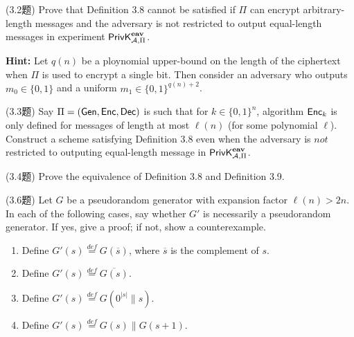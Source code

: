 \begin{questions}
    \question (3.2题) Prove that Definition 3.8 cannot be satisfied if $\Pi$ can encrypt arbitrary-length messages and the adversary is not restricted to output equal-length messages in experiment $\mathsf{PrivK}^{\textbf{eav}}_{\mathcal{A},\Pi}$.

        \textbf{Hint:} Let $q(n)$ be a ploynomial upper-bound on the length of the ciphertext when $\Pi$ is used to encrypt a single bit. Then consider an adversary who outputs $m_0\in\{0,1\}$ and a uniform $m_1\in\{0,1\}^{q(n)+2}$.

        \begin{solution}
        \end{solution}

    \question (3.3题) Say $\Pi=(\mathsf{Gen},\mathsf{Enc},\mathsf{Dec})$ is such that for $k\in\{0,1\}^n$, algorithm $\mathsf{Enc}_k$ is only defined for messages of length at most $\ell(n)$ (for some polynomial $\ell$). Construct a scheme satisfying Definition 3.8 even when the adversary is $not$ restricted to outputing equal-length message in $\mathsf{PrivK}^{\textbf{eav}}_{\mathcal{A},\Pi}$.

        \begin{solution}
        \end{solution}

    \question (3.4题) Prove the equivalence of Definition 3.8 and Definition 3.9.

        \begin{solution}
        \end{solution}

    \question (3.6题) Let $G$ be a pseudorandom generator with expansion factor $\ell(n)>2n$. In each of the following cases, say whether $G'$ is necessarily a pseudorandom generator. If yes, give a proof; if not, show a counterexample.

        \begin{enumerate}
            \item Define $G'(s)\overset{def}{=}G(\overline{s})$, where $\overline{s}$ is the complement of $s$.
            \item Define $G'(s)\overset{def}{=}\overline{G(s)}$.
            \item Define $G'(s)\overset{def}{=}G(0^{|s|}\parallel{s})$.
            \item Define $G'(s)\overset{def}{=}G(s)\parallel{G(s+1)}$.
        \end{enumerate}


\end{questions}
